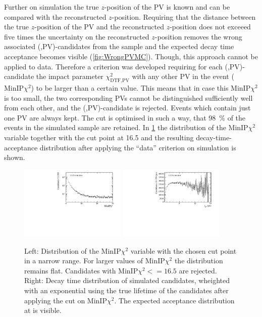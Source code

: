 Further on simulation the true $z$-position of the \ac{PV} is known and can be compared with the reconstructed $z$-position.
Requiring that the distance between the true $z$-position of the \ac{PV} and the reconstructed $z$-position does not exceeed five times the uncertainty on the reconstructed $z$-position removes the wrong associated (\Bz,\ac{PV})-candidates from the sample and the expected decay time acceptance becomes visible (\cref{fig:WrongPVMC}).
Though, this approach cannot be applied to data.
Therefore a criterion was developed requiring for each (\Bz,\ac{PV})-candidate the impact parameter $\chi^2_{\text{DTF,PV}}$ with any other \ac{PV} in the event ($\text{MinIP}\chi^2$) to be larger than a certain value.
This means that in case this $\text{MinIP}\chi^2$ is too small, the two corresponding \ac{PV}s cannot be distinguished sufficiently well from each other, and the (\Bz,\ac{PV})-candidate is rejected.
Events which contain just one \ac{PV} are always kept.
The cut is optimised in such a way, that \SI{98}{\percent} of the events in the simulated \BdToDpi sample are retained.
In \cref{fig:WrongPVData} the distribution of the $\text{MinIP}\chi^2$ variable together with the cut point at \num{16.5} and the resulting decay-time-acceptance distribution after applying the \enquote{data} criterion on simulation is shown.
\begin{figure}[tbp]
    \centering
    \includegraphics[width=0.45\textwidth]{06selection/figs/MinIPCHI2.pdf}
    \includegraphics[width=0.45\textwidth]{06selection/figs/WrongPVs-WeightingGoodData.pdf}
    \caption{Left: Distribution of the $\text{MinIP}\chi^2$ variable with the chosen cut point in a narrow range.
    For larger values of $\text{MinIP}\chi^2$ the distribution remains flat.
    Candidates with $\text{MinIP}\chi^2<=16.5$ are rejected.
    Right: Decay time distribution of simulated \BdToDpi candidates, wheighted with an exponential using the true lifetime of the \Bz candidates after applying the cut on $\text{MinIP}\chi^2$.
    The expected acceptance distribution at \lhcb is visible.}
    \label{fig:WrongPVData}
\end{figure}

